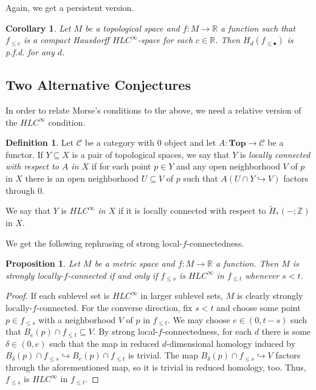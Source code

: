 \documentclass{amsart}
\theoremstyle{plain}
\newtheorem{cor}[thm]{Corollary}
\newtheorem{prop}[thm]{Proposition}
\theoremstyle{definition}
\newtheorem{defi}[thm]{Definition}
\begin{document}
Again, we get a persistent version.

\begin{cor}
Let $M$ be a topological space and $f\colon M\to\mathbb{R}$ a function such that $f_{\leq c}$ is a compact Hausdorff $HLC^\infty$-space for each $c\in\mathbb{R}$. Then $H_d(f_{\leq\bullet})$ is p.f.d. for any $d$.
\end{cor}

\subsection{Two Alternative Conjectures}
In order to relate Morse's conditions to the above, we need a relative version of the $HLC^{\infty}$ condition.

\begin{defi}\label{defi:hlc}
Let $\mathcal{C}$ be a category with $0$ object and let $A\colon\mathbf{Top}\to\mathcal{C}$ be a functor. If $Y\subseteq X$ is a pair of topological spaces, we say that $Y$ is \emph{locally connected with respect to $A$ in $X$} if for each point $p\in Y$ and any open neighborhood $V$ of $p$ in $X$ there is an open neighborhood $U\subseteq V$ of $p$ such that $A(U\cap Y\hookrightarrow V)$ factors through 0.

We say that $Y$ is \emph{$HLC^{\infty}$ in $X$} if it is locally connected with respect to $\tilde{H}_*(-;\mathbb{Z})$ in $X$.
\end{defi}

We get the following rephrasing of strong local-$f$-connectedness.

\begin{prop}
Let $M$ be a metric space and $f\colon M\to\mathbb{R}$ a function. Then $M$ is strongly locally-$f$-connected if and only if $f_{\leq s}$ is $HLC^{\infty}$ in $f_{\leq t}$ whenever $s<t$.
\end{prop}
\begin{proof}
If each sublevel set is $HLC^{\infty}$ in larger sublevel sets, $M$ is clearly strongly locally-$f$-connected. For the converse direction, fix $s<t$ and choose some point $p\in f_{\leq s}$ with a neighborhood $V$ of $p$ in $f_{\leq t}$. We may choose $e\in(0, t-s)$ such that $B_e(p)\cap f_{\leq t}\subseteq V$. By strong local-$f$-connectedness, for each $d$ there is some $\delta\in(0,e)$ such that the map in reduced $d$-dimensional homology induced by $B_{\delta}(p)\cap f_{\leq s}\hookrightarrow B_e(p)\cap f_{\leq t}$ is trivial. The map $B_{\delta}(p)\cap f_{\leq s}\hookrightarrow V$ factors through the aforementioned map, so it is trivial in reduced homology, too. Thus, $f_{\leq s}$ is $HLC^{\infty}$ in $f_{\leq t}$.
\end{proof}
\end{document}
